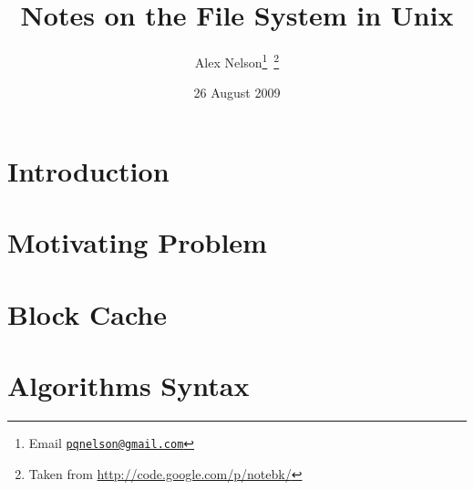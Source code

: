 \documentclass{article}
\title{Notes on the File System in Unix}
\author{Alex Nelson\footnote{Email \href{mailto:pqnelson@gmail.com}{\tt pqnelson@gmail.com}}~\footnote{Taken from \url{http://code.google.com/p/notebk/}}}
\date{26 August 2009}
\begin{document}
\maketitle
\tableofcontents
\pagebreak
\section{Introduction}


\section{Motivating Problem}


\section{Block Cache}


%
\appendix
\section{Algorithms Syntax}


\nocite{*}


\end{document}
